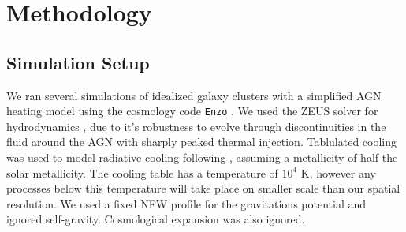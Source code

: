 \documentclass[iop,apjl, twocolappendix]{emulateapj}   %
\begin{document}

\section{Methodology}
\label{sec:methodology}

\subsection{Simulation Setup}
\label{sec:simulation_setup}

We ran several simulations of idealized galaxy clusters with a simplified AGN
heating model using the cosmology code \texttt{Enzo} \cite{bryan_enzo_2014-1}.
We used the ZEUS solver for hydrodynamics \cite{stone_zeus-2d_1992}, due to
it's robustness to evolve through discontinuities in the fluid around the AGN
with sharply peaked thermal injection. Tablulated cooling was used to model
radiative cooling following \citep{schure_new_2009-2}, assuming a metallicity
of half the solar metallicity. The cooling table has a temperature of $10^4
\text{ K}$, however any processes below this temperature will take place on
smaller scale than our spatial resolution. We used a fixed NFW profile for the
gravitations potential and ignored self-gravity.  Cosmological expansion was
also ignored.
\end{document}
